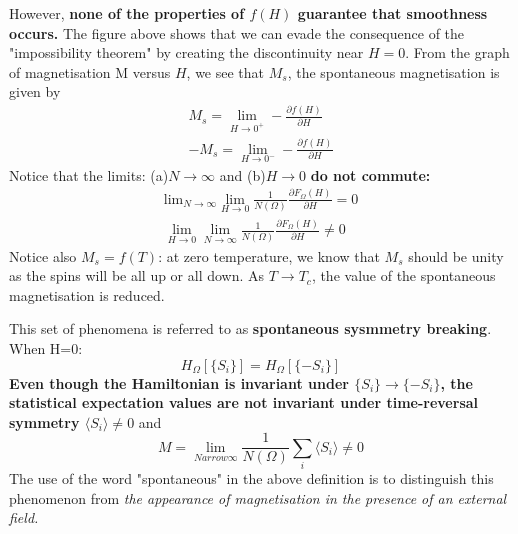 \documentclass[12pt,titlepage]{article}
\numberwithin{equation}{section}
\begin{document}
However, \textbf{none of the properties of $f(H)$ guarantee that smoothness occurs.} The figure above shows that we can evade the consequence of the "impossibility theorem" by creating the discontinuity near $H=0$. From the graph of magnetisation M versus $H$, we see that $M_s$, the spontaneous magnetisation is given by
\begin{equation}
    \begin{array}{l}{ M _ { s } = \lim _ { H \rightarrow 0 ^ { + } } - \frac { \partial f ( H ) } { \partial H } }\\{ - M _ { s } = \lim _ { H \rightarrow 0 ^ { - } } - \frac { \partial f ( H ) } { \partial H } }\end{array} 
\end{equation}
Notice that the limits: (a)$N\rightarrow\infty$ and (b)$H\rightarrow0$ \textbf{do not commute:}
\begin{equation}
    \begin{array} { l } {  \text{lim}_{N \rightarrow \infty}  \lim _ { H \rightarrow 0 } \frac { 1 } { N ( \Omega ) } \frac { \partial F _ { \Omega } ( H ) } { \partial H } = 0 } \\ { \lim _ { H \rightarrow 0 } \lim _ { N \rightarrow \infty } \frac { 1 } { N ( \Omega ) } \frac { \partial F _ { \Omega } ( H ) } { \partial H } \neq 0 } \end{array} 
\end{equation}
Notice also $M_s=f(T)$: at zero temperature, we know that $M_s$ should be unity as the spins will be all up or all down. As $T\rightarrow T_c$, the value of the spontaneous magnetisation is reduced.

This set of phenomena is referred to as \textbf{spontaneous sysmmetry breaking}. When H=0:
\begin{equation}
    H _ { \Omega } [ \{ S _ { i } \} ] = H _ { \Omega } [ \{ - S _ { i } \} ]
\end{equation}
\textbf{Even though the Hamiltonian is invariant under $\{S_i\}\rightarrow\{-S_i\}$, the statistical expectation values are not invariant under time-reversal symmetry $\langle S_i\rangle\neq0$} and
\begin{equation}
    M=\lim _ { N arrow \infty } \frac { 1 } { N ( \Omega ) } \sum _ { i } \langle S _ { i } \rangle\neq0
\end{equation}
The use of the word "spontaneous" in the above definition is to distinguish this phenomenon from \emph{the appearance of magnetisation in the presence of an external field.}
\end{document}

